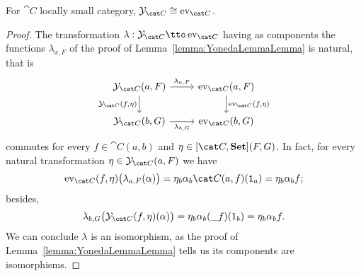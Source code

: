 \begin{proposition}
For \(\cat C\) locally small category, \(\yo_{\cat C} \cong \ev_{\cat C}\).
\end{proposition}

\begin{proof}
The transformation \(\lambda : \yo_{\cat C} \tto \ev_{\cat C}\) having as components the functions \(\lambda_{x, F}\) of the proof of Lemma~\ref{lemma:YonedaLemmaLemma} is natural, that is
\[\begin{tikzcd}
\yo_{\cat C} (a, F) \ar["\lambda_{a, F}", r] \ar["{\yo_{\cat C}(f, \eta)}", d, swap] & \ev_{\cat C} (a, F) \ar["{\ev_{\cat C}(f, \eta)}", d] \\
\yo_{\cat C} (b, G) \ar["\lambda_{b, G}", r, swap] & \ev_{\cat C}(b, G)
\end{tikzcd}\]
commutes for every \(f \in \cat C(a, b)\) and \(\eta \in [\cat C, \Set](F, G)\). In fact, for every natural transformation \(\eta \in \yo_{\cat C}(a, F)\) we have
\[\ev_{\cat C}(f, \eta) \big(\lambda_{a, F} (\alpha)\big) =  \eta_b\alpha_b \cat C(a, f)(\id_a) = \eta_b \alpha_b f ;\]
besides,
\[\lambda_{b, G} \big(\yo_{\cat C}(f, \eta) (\alpha)\big) = \eta_b \alpha_b (\_ f)(1_b) = \eta_b \alpha_b f .\]
%
We can conclude \(\lambda\) is an isomorphism, as the proof of Lemma~\ref{lemma:YonedaLemmaLemma} tells us its components are isomorphisms.
\end{proof}
